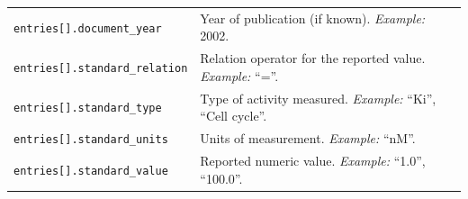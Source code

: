 \documentclass{article}
\begin{document}
\begin{table}[!htbp]
\begin{center}
\begin{tabularx}{\textwidth}{p{6cm}X}
\addlinespace
\texttt{entries[].document\_year} & Year of publication (if known). \emph{Example:} 2002. \\
\addlinespace
\texttt{entries[].standard\_relation} & Relation operator for the reported value. \emph{Example:} “=”. \\
\addlinespace
\texttt{entries[].standard\_type} & Type of activity measured. \emph{Example:} “Ki”, “Cell cycle”. \\
\addlinespace
\texttt{entries[].standard\_units} & Units of measurement. \emph{Example:} “nM”. \\
\addlinespace
\texttt{entries[].standard\_value} & Reported numeric value. \emph{Example:} “1.0”, “100.0”. \\
\bottomrule
\end{tabularx}
\end{center}
\end{table}
\end{document}
